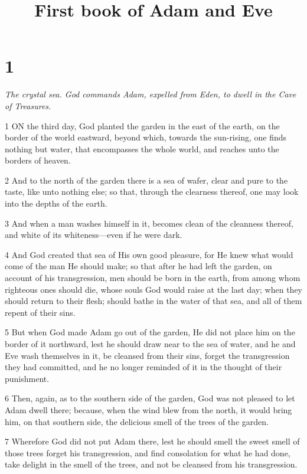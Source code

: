 

\title{First book of Adam and Eve}

\chapter{1}

\par \textit{The crystal sea. God commands Adam, expelled from Eden, to dwell in the Cave of Treasures.}

\par 1 ON the third day, God planted the garden in the east of the earth, on the border of the world eastward, beyond which, towards the sun-rising, one finds nothing but water, that encompasses the whole world, and reaches unto the borders of heaven.

\par 2 And to the north of the garden there is a sea of wafer, clear and pure to the taste, like unto nothing else; so that, through the clearness thereof, one may look into the depths of the earth.

\par 3 And when a man washes himself in it, becomes clean of the cleanness thereof, and white of its whiteness—even if he were dark.

\par 4 And God created that sea of His own good pleasure, for He knew what would come of the man He should make; so that after he had left the garden, on account of his transgression, men should be born in the earth, from among whom righteous ones should die, whose souls God would raise at the last day; when they should return to their flesh; should bathe in the water of that sea, and all of them repent of their sins.

\par 5 But when God made Adam go out of the garden, He did not place him on the border of it northward, lest he should draw near to the sea of water, and he and Eve wash themselves in it, be cleansed from their sins, forget the transgression they had committed, and he no longer reminded of it in the thought of their punishment.

\par 6 Then, again, as to the southern side of the garden, God was not pleased to let Adam dwell there; because, when the wind blew from the north, it would bring him, on that southern side, the delicious smell of the trees of the garden.

\par 7 Wherefore God did not put Adam there, lest he should smell the sweet smell of those trees forget his transgression, and find consolation for what he had done, take delight in the smell of the trees, and not be cleansed from his transgression.

